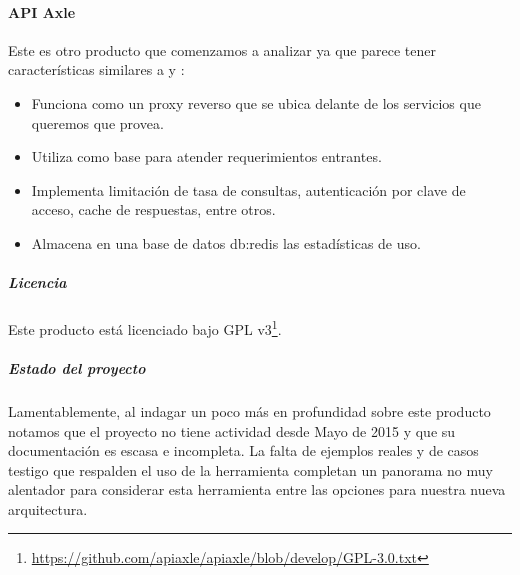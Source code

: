 \paragraph{API Axle}
\label{soa:tecnologias:api-axle}

Este es otro producto que comenzamos a analizar ya que parece tener características similares a  y :

\begin{itemize}
  \item Funciona como un proxy reverso que se ubica delante de los servicios que queremos que provea.
  \item Utiliza  como base para atender requerimientos entrantes.
  \item Implementa limitación de tasa de consultas, autenticación por clave de acceso, cache de respuestas, entre otros.
  \item Almacena en una base de datos \gls{db:redis} las estadísticas de uso.
\end{itemize}

\subparagraph{Licencia}

Este producto está licenciado bajo GPL v3\footnote{\url{https://github.com/apiaxle/apiaxle/blob/develop/GPL-3.0.txt}}.

\subparagraph{Estado del proyecto}

Lamentablemente, al indagar un poco más en profundidad sobre este producto notamos que el proyecto no tiene actividad desde Mayo de 2015 y que su documentación es escasa e incompleta. La falta de ejemplos reales y de casos testigo que respalden el uso de la herramienta completan un panorama no muy alentador para considerar esta herramienta entre las opciones para nuestra nueva arquitectura.
